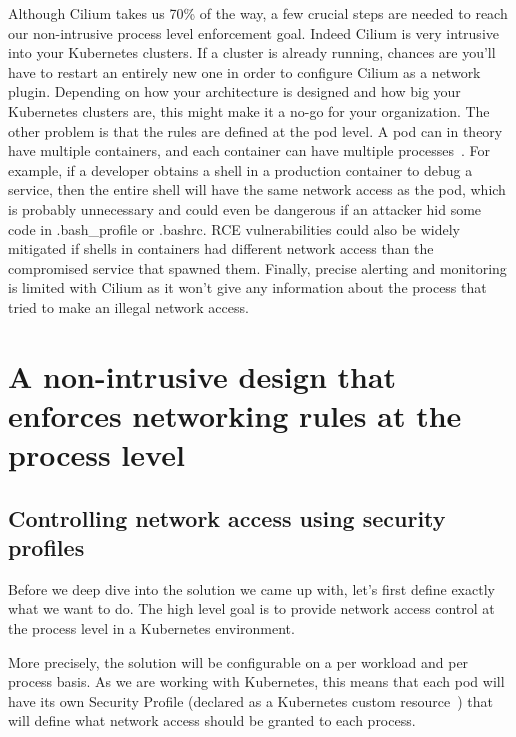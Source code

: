Although Cilium takes us 70\% of the way, a few crucial steps are needed to reach our non-intrusive process level enforcement goal. Indeed Cilium is very intrusive into your Kubernetes clusters. If a cluster is already running, chances are you’ll have to restart an entirely new one in order to configure Cilium as a network plugin. Depending on how your architecture is designed and how big your Kubernetes clusters are, this might make it a no-go for your organization. The other problem is that the rules are defined at the pod level. A pod can in theory have multiple containers, and each container can have multiple processes~\cite{ProcessLevelNetworkSecurityMonitoring:StefanSchimanskiMichaelHausenblas}. For example, if a developer obtains a shell in a production container to debug a service, then the entire shell will have the same network access as the pod, which is probably unnecessary and could even be dangerous if an attacker hid some code in .bash\_profile or .bashrc. RCE vulnerabilities could also be widely mitigated if shells in containers had different network access than the compromised service that spawned them. Finally, precise alerting and monitoring is limited with Cilium as it won’t give any information about the process that tried to make an illegal network access.

\section{A non-intrusive design that enforces networking rules at the process level}

\subsection{Controlling network access using security profiles}

Before we deep dive into the solution we came up with, let’s first define exactly what we want to do. The high level goal is to provide network access control at the process level in a Kubernetes environment.

More precisely, the solution will be configurable on a per workload and per process basis. As we are working with Kubernetes, this means that each pod will have its own Security Profile (declared as a Kubernetes custom resource~\cite{ProcessLevelNetworkSecurityMonitoring:CustomResources}) that will define what network access should be granted to each process.


